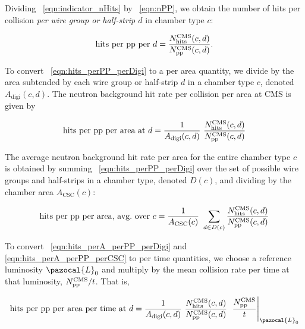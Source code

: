 
Dividing \Eq~\ref{eqn:indicator_nHits} by \Eq~\ref{eqn:nPP}, we obtain
the number of hits per \pp collision {\em per wire group or
half-strip $d$} in chamber type $c$:

\begin{equation}
	\label{eqn:hits_perPP_perDigi}
\text{hits per \pp per $d$} = 
      \frac{N_\text{hits}^\text{CMS}(c,d)}{N_\text{\pp}^\text{CMS}(c,d)}.
\end{equation}

To convert \Eq~\ref{eqn:hits_perPP_perDigi} to a per area quantity, we divide by the area subtended by each wire group or half-strip $d$ in a chamber type $c$, denoted $A_\text{digi}(c, d)$. The neutron background hit rate per \pp collision per area at CMS is given by

\begin{equation}
	\label{eqn:hits_perA_perPP_perDigi}
\text{hits per \pp per area at $d$} = 
   \frac{1}{A_\text{digi}(c, d)}  \  \frac{N_\text{hits}^\text{CMS}(c,d)}{N_\text{\pp}^\text{CMS}(c,d)}
\end{equation}

The average neutron background hit rate per area for the entire chamber type $c$ is obtained by summing \Eq~\ref{eqn:hits_perPP_perDigi} over the set of possible wire groups and half-strips in a chamber type, denoted $D(c)$, and dividing by the chamber area $A_\text{CSC}(c)$:

\begin{equation}
	\label{eqn:hits_perA_perPP_perCSC}
\text{hits per \pp per area, avg.\ over $c$} = 
   \frac{1}{A_\text{CSC}(c)}  \  \sum_{d\in D(c)}{\frac{N_\text{hits}^\text{CMS}(c,d)}{N_\text{\pp}^\text{CMS}(c,d)}}
\end{equation}

To convert \Eqs~\ref{eqn:hits_perA_perPP_perDigi} and \ref{eqn:hits_perA_perPP_perCSC} to per time quantities, we choose a reference luminosity $\pazocal{L}_0$ and multiply by the mean \pp collision rate per time at that luminosity, $N_\text{\ensuremath{\mathrm{p}}\ensuremath{\mathrm{p}}}^\text{CMS}/t$. That is,

\begin{equation}
    \label{eqn:hits_perA_perT_perDigi}
\text{hits per \pp per area per time at $d$} =  
  \frac{1}{A_\text{digi}(c, d)}  \  \frac{N_\text{hits}^\text{CMS}(c,d)}{N_\text{\pp}^\text{CMS}(c,d)}  \  \left.\frac{N_\text{\pp}^\text{CMS}}{t}\right|_{\pazocal{L}_0}
\end{equation}

